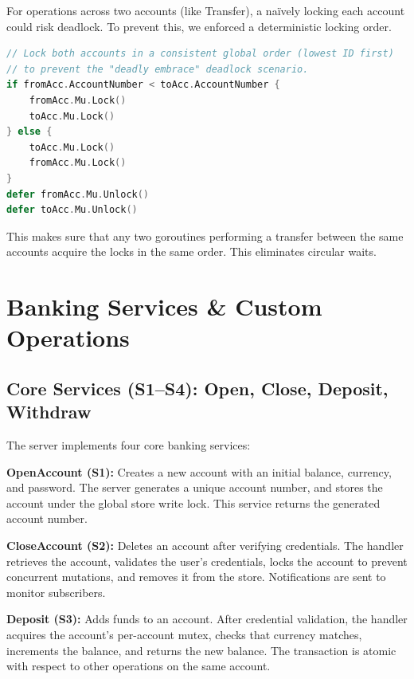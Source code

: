 \documentclass[9pt,a4paper]{article}
\begin{document}
For operations across two accounts (like Transfer), a na\"ively locking each account could risk deadlock.
To prevent this, we enforced a deterministic locking order.
 
\begin{lstlisting}[language=Go, style=modernGo, caption={Deadlock-safe lock ordering in Transfer (bank.go)}, label={lst:lock-order}]
// Lock both accounts in a consistent global order (lowest ID first)
// to prevent the "deadly embrace" deadlock scenario.
if fromAcc.AccountNumber < toAcc.AccountNumber {
    fromAcc.Mu.Lock()
    toAcc.Mu.Lock()
} else {
    toAcc.Mu.Lock()
    fromAcc.Mu.Lock()
}
defer fromAcc.Mu.Unlock()
defer toAcc.Mu.Unlock()
\end{lstlisting}

This makes sure that any two goroutines performing a transfer between the same accounts acquire the locks in the same order.
This eliminates circular waits.

\section{Banking Services \& Custom Operations}

\subsection{Core Services (S1–S4): Open, Close, Deposit, Withdraw}

The server implements four core banking services:

\textbf{OpenAccount (S1):} Creates a new account with an initial balance, currency, and password. The server generates a unique account number, and stores the account under the global store write lock. This service returns the generated account number.

\textbf{CloseAccount (S2):} Deletes an account after verifying credentials. The handler retrieves the account, validates the user's credentials, locks the account to prevent concurrent mutations, and removes it from the store. Notifications are sent to monitor subscribers.

\textbf{Deposit (S3):} Adds funds to an account. After credential validation, the handler acquires the account's per-account mutex, checks that currency matches, increments the balance, and returns the new balance. The transaction is atomic with respect to other operations on the same account.
\end{document}
